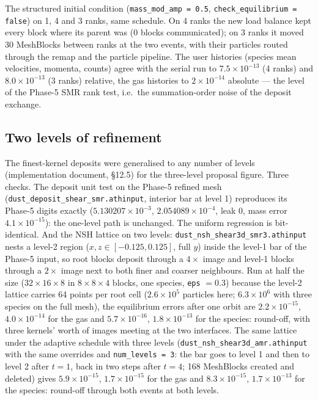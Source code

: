 \documentclass[11pt]{article}
\newcommand{\code}[1]{\texttt{#1}}
\newcommand{\file}[1]{\texttt{#1}}
\begin{document}
The structured initial condition (\code{mass\_mod\_amp = 0.5},
\code{check\_equilibrium = false}) on 1, 4 and 3 ranks, same schedule. On 4 ranks the
new load balance kept every block where its parent was (0 blocks communicated); on 3
ranks it moved 30 MeshBlocks between ranks at the two events, with their particles
routed through the remap and the particle pipeline. The user histories (species mean
velocities, momenta, counts) agree with the serial run to $7.5\times10^{-13}$ (4 ranks)
and $8.0\times10^{-13}$ (3 ranks) relative, the gas histories to $2\times10^{-14}$
absolute --- the level of the Phase-5 SMR rank test, i.e.\ the summation-order noise of
the deposit exchange.

\subsection{Two levels of refinement}
\label{sec:phase6-levels}

The finest-kernel deposits were generalised to any number of levels (implementation
document, \S12.5) for the three-level proposal figure. Three checks. The deposit unit test
on the Phase-5 refined mesh (\file{dust\_deposit\_shear\_smr.athinput}, interior bar at
level 1) reproduces its Phase-5 digits exactly ($5.130207\times10^{-3}$,
$2.054089\times10^{-4}$, leak 0, mass error $4.1\times10^{-15}$): the one-level path is
unchanged. The uniform regression is bit-identical. And the NSH lattice on two levels:
\file{dust\_nsh\_shear3d\_smr3.athinput} nests a level-2 region ($x, z \in
[-0.125, 0.125]$, full $y$) inside the level-1 bar of the Phase-5 input, so root blocks
deposit through a $4\times$ image and level-1 blocks through a $2\times$ image next to
both finer and coarser neighbours. Run at half the size ($32\times16\times8$ in
$8\times8\times4$ blocks, one species, \code{eps} $= 0.3$) because the level-2 lattice
carries 64 points per root cell ($2.6\times10^5$ particles here; $6.3\times10^6$ with
three species on the full mesh), the equilibrium errors after one orbit are $2.2\times10^{-15}$, $4.0\times10^{-14}$ for
the gas and $5.7\times10^{-16}$, $1.8\times10^{-13}$ for the species: round-off, with
three kernels' worth of images meeting at the two interfaces. The
same lattice under the adaptive schedule with three levels
(\file{dust\_nsh\_shear3d\_amr.athinput} with the same overrides and
\code{num\_levels = 3}: the bar goes to level 1 and then to level 2 after $t = 1$, back
in two steps after $t = 4$; 168 MeshBlocks created and deleted) gives
$5.9\times10^{-15}$, $1.7\times10^{-15}$ for the gas and $8.3\times10^{-15}$,
$1.7\times10^{-13}$ for the species: round-off through both events at both levels.
\end{document}
